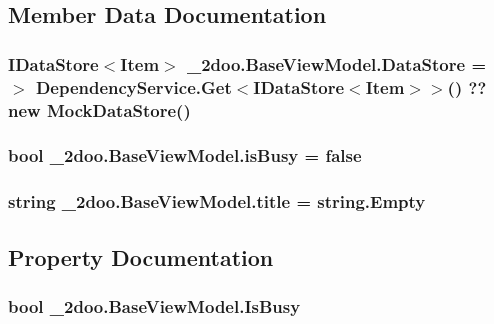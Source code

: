 \subsection{Member Data Documentation}
\hypertarget{class__2doo_1_1_base_view_model_815111804c4cdcfd99aa3d1d4abe83dc}{
\subsubsection[{DataStore}]{\setlength{\rightskip}{0pt plus 5cm}IDataStore$<${\bf Item}$>$ {\bf \_\-2doo.BaseViewModel.DataStore} = $>$ DependencyService.Get$<$IDataStore$<${\bf Item}$>$$>$() ?? new {\bf MockDataStore}()}}
\label{class__2doo_1_1_base_view_model_815111804c4cdcfd99aa3d1d4abe83dc}


\hypertarget{class__2doo_1_1_base_view_model_2a7c2caffdf4c32c0c29841b5165d900}{
\subsubsection[{isBusy}]{\setlength{\rightskip}{0pt plus 5cm}bool {\bf \_\-2doo.BaseViewModel.isBusy} = false}}
\label{class__2doo_1_1_base_view_model_2a7c2caffdf4c32c0c29841b5165d900}


\hypertarget{class__2doo_1_1_base_view_model_c0cfcfe34cfd7f175d26314e08c8052d}{
\subsubsection[{title}]{\setlength{\rightskip}{0pt plus 5cm}string {\bf \_\-2doo.BaseViewModel.title} = string.Empty}}
\label{class__2doo_1_1_base_view_model_c0cfcfe34cfd7f175d26314e08c8052d}




\subsection{Property Documentation}
\hypertarget{class__2doo_1_1_base_view_model_c94a9074f3da1063580a04e1d3cb2dcb}{
\subsubsection[{IsBusy}]{\setlength{\rightskip}{0pt plus 5cm}bool \_\-2doo.BaseViewModel.IsBusy}}
\label{class__2doo_1_1_base_view_model_c94a9074f3da1063580a04e1d3cb2dcb}


